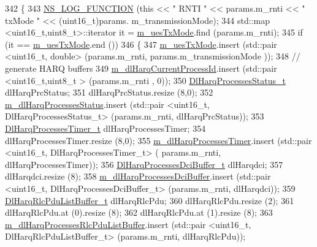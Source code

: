 \begin{DoxyCode}
342 \{
343   \hyperlink{log-macros-disabled_8h_a90b90d5bad1f39cb1b64923ea94c0761}{NS\_LOG\_FUNCTION} (\textcolor{keyword}{this} << \textcolor{stringliteral}{" RNTI "} << params.m\_rnti << \textcolor{stringliteral}{" txMode "} << (uint16\_t)params.
      m\_transmissionMode);
344   std::map <uint16\_t,uint8\_t>::iterator it = \hyperlink{classns3_1_1PssFfMacScheduler_a48aa1d9dc22e9c73e3c2206be76bb6cd}{m\_uesTxMode}.find (params.m\_rnti);
345   \textcolor{keywordflow}{if} (it == \hyperlink{classns3_1_1PssFfMacScheduler_a48aa1d9dc22e9c73e3c2206be76bb6cd}{m\_uesTxMode}.end ())
346     \{
347       \hyperlink{classns3_1_1PssFfMacScheduler_a48aa1d9dc22e9c73e3c2206be76bb6cd}{m\_uesTxMode}.insert (std::pair <uint16\_t, double> (params.m\_rnti, params.m\_transmissionMode
      ));
348       \textcolor{comment}{// generate HARQ buffers}
349       \hyperlink{classns3_1_1PssFfMacScheduler_a860dc1e5d114893e493e5ff2696d7171}{m\_dlHarqCurrentProcessId}.insert (std::pair <uint16\_t,uint8\_t > (params.m\_rnti
      , 0));
350       \hyperlink{namespacens3_a457b3571b67ff17d042e9894e90e2ce2}{DlHarqProcessesStatus\_t} dlHarqPrcStatus;
351       dlHarqPrcStatus.resize (8,0);
352       \hyperlink{classns3_1_1PssFfMacScheduler_aaddeb3fa864cb82b5829d4ca1cf9abea}{m\_dlHarqProcessesStatus}.insert (std::pair <uint16\_t, DlHarqProcessesStatus\_t> 
      (params.m\_rnti, dlHarqPrcStatus));
353       \hyperlink{namespacens3_a39413ade536de4b1c82d6c0074cc703e}{DlHarqProcessesTimer\_t} dlHarqProcessesTimer;
354       dlHarqProcessesTimer.resize (8,0);
355       \hyperlink{classns3_1_1PssFfMacScheduler_afcae17e3f08b0a6f1e1458a39da8cdcb}{m\_dlHarqProcessesTimer}.insert (std::pair <uint16\_t, DlHarqProcessesTimer\_t> (
      params.m\_rnti, dlHarqProcessesTimer));
356       \hyperlink{namespacens3_af25599bf8f9f564075c005759c9af18c}{DlHarqProcessesDciBuffer\_t} dlHarqdci;
357       dlHarqdci.resize (8);
358       \hyperlink{classns3_1_1PssFfMacScheduler_a167441dd2a0e5cde664eedfd19a07fbf}{m\_dlHarqProcessesDciBuffer}.insert (std::pair <uint16\_t,
       DlHarqProcessesDciBuffer\_t> (params.m\_rnti, dlHarqdci));
359       \hyperlink{namespacens3_a4c0cbd1e72f1c667f8b5879655f13210}{DlHarqRlcPduListBuffer\_t} dlHarqRlcPdu;
360       dlHarqRlcPdu.resize (2);
361       dlHarqRlcPdu.at (0).resize (8);
362       dlHarqRlcPdu.at (1).resize (8);
363       \hyperlink{classns3_1_1PssFfMacScheduler_a0f31f16c2a9f067c6189462a9797e06b}{m\_dlHarqProcessesRlcPduListBuffer}.insert (std::pair <uint16\_t,
       DlHarqRlcPduListBuffer\_t> (params.m\_rnti, dlHarqRlcPdu));

\end{DoxyCode}
